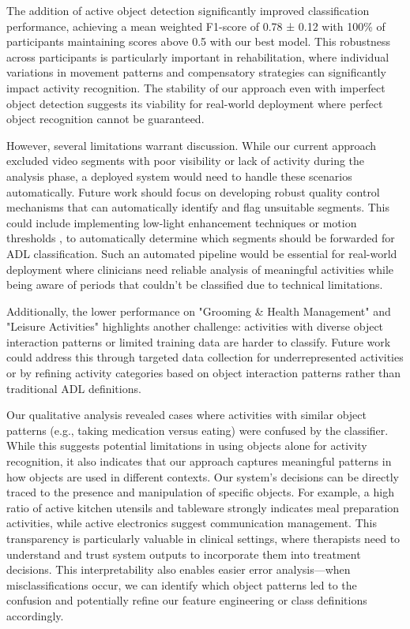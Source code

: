 \documentclass[journal,twoside,web]{ieeecolor}
\begin{document}
The addition of active object detection significantly improved classification performance, achieving a mean weighted F1-score of 0.78 ± 0.12 with 100\% of participants maintaining scores above 0.5 with our best model. This robustness across participants is particularly important in rehabilitation, where individual variations in movement patterns and compensatory strategies can significantly impact activity recognition. The stability of our approach even with imperfect object detection suggests its viability for real-world deployment where perfect object recognition cannot be guaranteed.

However, several limitations warrant discussion. While our current approach excluded video segments with poor visibility or lack of activity during the analysis phase, a deployed system would need to handle these scenarios automatically. Future work should focus on developing robust quality control mechanisms that can automatically identify and flag unsuitable segments. This could include implementing low-light enhancement techniques \cite{Singh2019-nd, Peng2022-lc} or motion thresholds \cite{Shruthi2017-ie}, to automatically determine which segments should be forwarded for ADL classification. Such an automated pipeline would be essential for real-world deployment where clinicians need reliable analysis of meaningful activities while being aware of periods that couldn't be classified due to technical limitations.

Additionally, the lower performance on "Grooming \& Health Management" and "Leisure Activities" highlights another challenge: activities with diverse object interaction patterns or limited training data are harder to classify. Future work could address this through targeted data collection for underrepresented activities or by refining activity categories based on object interaction patterns rather than traditional ADL definitions.

Our qualitative analysis revealed cases where activities with similar object patterns (e.g., taking medication versus eating) were confused by the classifier. While this suggests potential limitations in using objects alone for activity recognition, it also indicates that our approach captures meaningful patterns in how objects are used in different contexts. Our system's decisions can be directly traced to the presence and manipulation of specific objects. For example, a high ratio of active kitchen utensils and tableware strongly indicates meal preparation activities, while active electronics suggest communication management. This transparency is particularly valuable in clinical settings, where therapists need to understand and trust system outputs to incorporate them into treatment decisions. This interpretability also enables easier error analysis---when misclassifications occur, we can identify which object patterns led to the confusion and potentially refine our feature engineering or class definitions accordingly.
\end{document}
